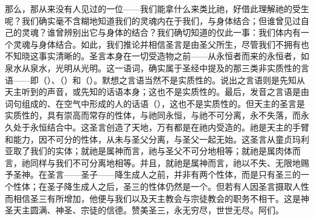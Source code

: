 那么，那从来没有人见过的一位——我们能拿什么来类比祂，好借此理解祂的受生呢？我们确实毫不含糊地知道我们的灵魂内在于我们，与身体结合；但谁曾见过自己的灵魂？谁曾辨别出它与身体的结合？我们确切知道的仅此一事：我们体内有一个灵魂与身体结合。如此，我们推论并相信圣言是由圣父所生，尽管我们不拥有也不知晓这事实清晰的。圣言本身在一切受造物之前——从永恒者而来的永恒者，如泉水从泉水，光明从光明。这一语词，确实属于圣经中提及的那三类非实质性的言语——即（）、（）和（）。默想之言语当然不是实质性的。说出之言语则是先知从天主听到的声音，或先知的话语本身；这也不是实质性的。最后，发音之言语是由词句组成的、在空气中形成的人的话语（），这也不是实质性的。但天主的圣言是实质性的，具有崇高而常存的性体，与祂同永恒，与祂不可分离，永不失落，而永久处于永恒结合中。这圣言创造了天地，万有都是在祂内受造的。祂是天主的手臂和能力，因不可分的性体，从未与圣父分离，与圣父一起无始。这圣言从童贞玛利亚取了我们的实体；就祂是属神而言，祂与圣父不可分地相等；就祂是属肉体而言，祂同样与我们不可分离地相等。并且，就祂是属神而言，祂以不失、无限地赐予圣神。在圣言——圣子——降生成人之前，并非有两个性体，而是只有圣三的一个性体；在圣子降生成人之后，圣三的性体仍然是一个。但若有人因圣言摄取人性而相信圣三有所增加，他便与我们以及天主教会与宗徒教会的职务不相干。这是神圣天主圆满、神圣、宗徒的信德。赞美圣三，永无穷尽，世世无尽。阿们。\par

